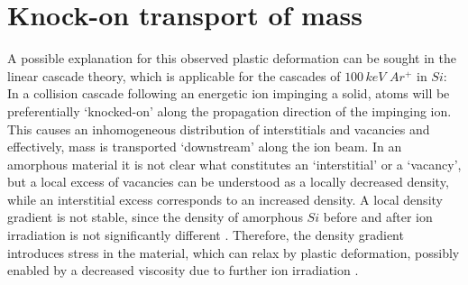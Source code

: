 \section{Knock-on transport of mass}

A possible explanation for this observed plastic deformation can be sought in the linear cascade theory, which is applicable for the cascades of $100\,keV\,\,Ar^+$ in $Si$: In a collision cascade following an energetic ion impinging a solid, atoms will be preferentially `knocked-on' along the propagation direction of the impinging ion. This causes an inhomogeneous distribution of interstitials and vacancies and effectively, mass is transported `downstream' along the ion beam. In an amorphous material it is not clear what constitutes an `interstitial' or a `vacancy', but a local excess of vacancies can be understood as a locally decreased density, while an interstitial excess corresponds to an increased density. A local density gradient is not stable, since the density of amorphous $Si$ before and after ion irradiation is not significantly different \cite{pelaz_ion-beam-induced_2004}. Therefore, the density gradient introduces stress in the material, which can relax by plastic deformation, possibly enabled by a decreased viscosity due to further ion irradiation \cite{snoeks_stress_1997,hu_burrowing_2002,mayr_mechanisms_2003,mayr_effect_2003}. 

